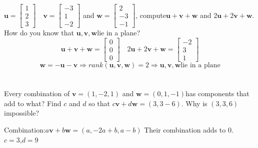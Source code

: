 \documentclass{article}
\begin{document}
\section{}
$\mathbf{u}=\begin{bmatrix}
    1\\2\\3
\end{bmatrix}\quad
\mathbf{v}=\begin{bmatrix}
    -3\\1\\-2
\end{bmatrix}$
and $\mathbf{w}=\begin{bmatrix}
    2\\-3\\-1
    \end{bmatrix}$,
compute$\mathbf{u}+\mathbf{v}+\mathbf{w}$
and $2\mathbf{u}+2\mathbf{v}+\mathbf{w}$.
How do you know that $\mathbf{u},\mathbf{v},\mathbf{w}$lie in a plane?
\[\mathbf{u}+\mathbf{v}+\mathbf{w}=\begin{bmatrix}
    0\\0\\0
\end{bmatrix}\quad
2\mathbf{u}+2\mathbf{v}+\mathbf{w}=\begin{bmatrix}
    -2\\3\\1
\end{bmatrix}
\]
\[\mathbf{w}=-\mathbf{u}-\mathbf{v}
\Rightarrow rank(\mathbf{u},\mathbf{v},\mathbf{w})=2
\Rightarrow \mathbf{u},\mathbf{v},\mathbf{w} \text{lie in a plane}
\]
\section{}
Every combination of $\mathbf{v}=(1,-2,1)$
and $\mathbf{w}=(0,1,-1)$has components that add to what?
Find $c$ and $d$ so that $c\mathbf{v}+d\mathbf{w}=(3,3-6)$.
Why is $(3,3,6)$  impossible?

Combination:$a\mathbf{v}+b\mathbf{w}=(a,-2a+b,a-b)$
Their combination adds to $0$.\\
$c=3$,$d=9$
\end{document}
